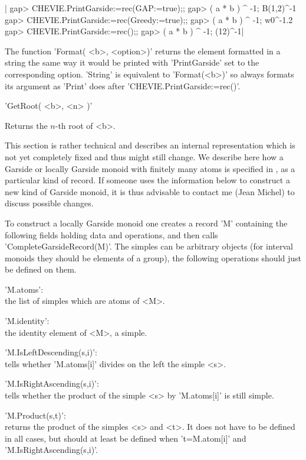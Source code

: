 |    gap> CHEVIE.PrintGarside:=rec(GAP:=true);;
    gap> ( a * b ) ^ -1;
    B(1,2)^-1
    gap> CHEVIE.PrintGarside:=rec(Greedy:=true);;
    gap> ( a * b ) ^ -1;
    w0^-1.2
    gap> CHEVIE.PrintGarside:=rec();;
    gap> ( a * b ) ^ -1;
    (12)^-1|

The  function 'Format( <b>,  <option>)' returns the  element formatted in a
string  the same  way it  would be  printed with  'PrintGarside' set to the
corresponding  option. 'String'  is equivalent  to 'Format(<b>)'  so always
formats its argument as 'Print' does after 'CHEVIE.PrintGarside:=rec()'.

'GetRoot( <b>, <n> )'

Returns the $n$-th root of <b>.


This  section is rather technical  and describes an internal representation
which  is not yet completely fixed and thus might still change. We describe
here  how a Garside or  locally Garside monoid with  finitely many atoms is
specified  in \CHEVIE, as a particular kind  of record. If someone uses the
information  below to construct  a new kind  of Garside monoid,  it is thus
advisable  to  contact  me  (Jean  Michel)  to discuss possible changes.

To  construct a locally Garside monoid  one creates a record 'M' containing
the   following  fields  holding  data   and  operations,  and  then  calls
'CompleteGarsideRecord(M)'.  The  simples  can  be  arbitrary  objects (for
interval  monoids  they  should  be  elements  of  a  group), the following
operations should just be defined on them.

'M.atoms':\\ the list of simples which are atoms of <M>.

'M.identity':\\ the identity element of <M>, a simple.

'M.IsLeftDescending(s,i)':\\ tells whether 'M.atoms[i]' divides on the left
the simple <s>.

'M.IsRightAscending(s,i)':\\ tells whether the product of the simple <s> by
'M.atoms[i]' is still simple.

'M.Product(s,t)':\\ returns the product of the simples <s> and <t>. It does
not  have to be defined  in all cases, but  should at least be defined when
't=M.atom[i]' and 'M.IsRightAscending(s,i)'.

